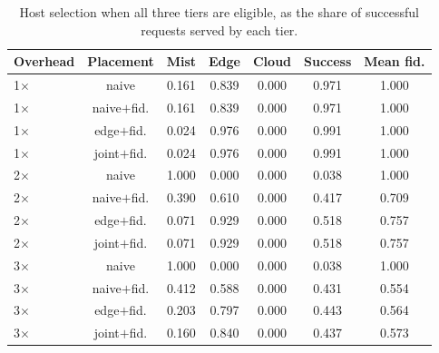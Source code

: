 \begin{table}
\centering
\scriptsize
\caption{Host selection when all three tiers are eligible, as the share of successful requests served by each tier.}
\label{tab:p2-tiers}
\begin{tabular}{lcccccc}
\toprule
Overhead & Placement & Mist & Edge & Cloud & Success & Mean fid. \\
\midrule
1$\times$ & naive & 0.161 & 0.839 & 0.000 & 0.971 & 1.000 \\
1$\times$ & naive$+$fid. & 0.161 & 0.839 & 0.000 & 0.971 & 1.000 \\
1$\times$ & edge$+$fid. & 0.024 & 0.976 & 0.000 & 0.991 & 1.000 \\
1$\times$ & joint$+$fid. & 0.024 & 0.976 & 0.000 & 0.991 & 1.000 \\
2$\times$ & naive & 1.000 & 0.000 & 0.000 & 0.038 & 1.000 \\
2$\times$ & naive$+$fid. & 0.390 & 0.610 & 0.000 & 0.417 & 0.709 \\
2$\times$ & edge$+$fid. & 0.071 & 0.929 & 0.000 & 0.518 & 0.757 \\
2$\times$ & joint$+$fid. & 0.071 & 0.929 & 0.000 & 0.518 & 0.757 \\
3$\times$ & naive & 1.000 & 0.000 & 0.000 & 0.038 & 1.000 \\
3$\times$ & naive$+$fid. & 0.412 & 0.588 & 0.000 & 0.431 & 0.554 \\
3$\times$ & edge$+$fid. & 0.203 & 0.797 & 0.000 & 0.443 & 0.564 \\
3$\times$ & joint$+$fid. & 0.160 & 0.840 & 0.000 & 0.437 & 0.573 \\
\bottomrule
\end{tabular}
\par\vspace{2pt}{\footnotesize\raggedright Cloud share is zero at every level and every arm: the cloud is reachable and never chosen, which is why the placement factor has nothing to exploit.\par}
\end{table}

